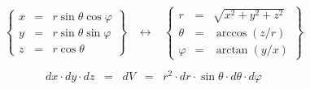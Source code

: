  \begin{displaymath}
 \left\{
 \begin{array}{ccl}
 x&=&r\sin\theta\cos\varphi\\
 y&=&r\sin\theta\sin\varphi\\
 z&=&r\cos\theta
 \end{array}
 \right\}\;\;\;
 \leftrightarrow\;\;\;
 \left\{
 \begin{array}{ccl}
 r&=&\sqrt{x^2+y^2+z^2}\\
 \theta&=&\arccos\left(z/r\right)\\
 \varphi&=&\arctan\left(y/x\right)
 \end{array}
 \right\}
 \end{displaymath}

 \begin{displaymath}
dx\cdot dy\cdot dz\;\;=\;\;dV\;\;=\;\;r^2\cdot dr\cdot\sin\theta\cdot d\theta\cdot d\varphi
 \end{displaymath}

